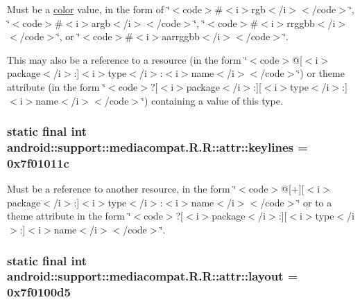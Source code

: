 Must be a \hyperlink{classandroid_1_1support_1_1mediacompat_1_1_r_1_1color}{color} value, in the form of \char`\"{}$<$code$>$\#$<$i$>$rgb$<$/i$>$$<$/code$>$\char`\"{}, \char`\"{}$<$code$>$\#$<$i$>$argb$<$/i$>$$<$/code$>$\char`\"{}, \char`\"{}$<$code$>$\#$<$i$>$rrggbb$<$/i$>$$<$/code$>$\char`\"{}, or \char`\"{}$<$code$>$\#$<$i$>$aarrggbb$<$/i$>$$<$/code$>$\char`\"{}. 

This may also be a reference to a resource (in the form \char`\"{}$<$code$>$@\mbox{[}$<$i$>$package$<$/i$>$:\mbox{]}$<$i$>$type$<$/i$>$:$<$i$>$name$<$/i$>$$<$/code$>$\char`\"{}) or theme attribute (in the form \char`\"{}$<$code$>$?\mbox{[}$<$i$>$package$<$/i$>$:\mbox{]}\mbox{[}$<$i$>$type$<$/i$>$:\mbox{]}$<$i$>$name$<$/i$>$$<$/code$>$\char`\"{}) containing a value of this type. \hypertarget{classandroid_1_1support_1_1mediacompat_1_1_r_1_1attr_7be338299289c4a128e4fc77d1709994}{
\subsubsection[{keylines}]{\setlength{\rightskip}{0pt plus 5cm}static final int android::support::mediacompat.R.R::attr::keylines = 0x7f01011c}}
\label{classandroid_1_1support_1_1mediacompat_1_1_r_1_1attr_7be338299289c4a128e4fc77d1709994}


Must be a reference to another resource, in the form \char`\"{}$<$code$>$@\mbox{[}+\mbox{]}\mbox{[}$<$i$>$package$<$/i$>$:\mbox{]}$<$i$>$type$<$/i$>$:$<$i$>$name$<$/i$>$$<$/code$>$\char`\"{} or to a theme attribute in the form \char`\"{}$<$code$>$?\mbox{[}$<$i$>$package$<$/i$>$:\mbox{]}\mbox{[}$<$i$>$type$<$/i$>$:\mbox{]}$<$i$>$name$<$/i$>$$<$/code$>$\char`\"{}. \hypertarget{classandroid_1_1support_1_1mediacompat_1_1_r_1_1attr_ce05491fbaa7c431126d9f5477fb5d83}{
\subsubsection[{layout}]{\setlength{\rightskip}{0pt plus 5cm}static final int android::support::mediacompat.R.R::attr::layout = 0x7f0100d5}}
\label{classandroid_1_1support_1_1mediacompat_1_1_r_1_1attr_ce05491fbaa7c431126d9f5477fb5d83}


